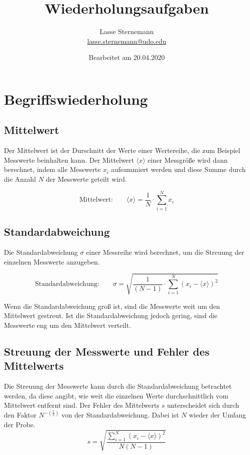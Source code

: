 \documentclass[titlepage = firstcover]{scrartcl}
\title{Wiederholungsaufgaben}
\author{
  Lasse Sternemann\\
  \href{mailto:lasse.sternemann@udo.edu}{lasse.sternemann@udo.edu}
}
\date{Bearbeitet am 20.04.2020}
\begin{document}
    
    \maketitle
    \newpage
    \tableofcontents
    \newpage


    \section{Begriffswiederholung}
        \subsection{Mittelwert}
            Der Mittelwert ist der Durschnitt der Werte einer Wertereihe, die zum Beispiel Messwerte beinhalten kann. Der Mittelwert $\langle x \rangle$ einer 
            Messgröße wird dann berechnet, indem alle Messwerte $x_i$ aufsummiert werden und diese Summe durch die Anzahl $N$ der Messwerte geteilt wird.

            \begin{equation}
                \text{Mittelwert:} \qquad \langle x \rangle = \frac{1}{N} \cdot \sum_{i=1}^N x_i
                \label{eqn:Mittelwert} 
            \end{equation}
            

        \subsection{Standardabweichung}
            Die Standardabweichung $\sigma$ einer Messreihe wird berechnet, um die Streuung der einzelnen Messwerte anzugeben.
            
            \begin{equation}
                \text{Standardabweichung:} \qquad \sigma = \sqrt{\frac{1}{\left(N-1\right)}\cdot \sum_{i=1}^N \left(x_i - \langle x \rangle \right)^2}
            \end{equation}
            
            \noindent Wenn die Standardabweichung groß ist, sind die Messwerte weit um den Mittelwert gestreut. Ist die Standardabweichung jedoch gering, 
            sind die Messwerte eng um den Mittelwert verteilt.

        \subsection{Streuung der Messwerte und Fehler des Mittelwerts}
            Die Streuung der Messwerte kann durch die Standardabweichung betrachtet werden, da diese angibt, wie weit die einzelnen Werte durchschnittlich vom
            Mittelwert entfernt sind. Der Fehler des Mittelwerts $s$ unterscheidet sich durch den Faktor $N^{-(\frac{1}{2})}$ von der Standardabweichung. Dabei ist 
            $N$ wieder der Umfang der Probe. 
            \begin{equation}
                s = \sqrt{\frac{\sum_{i=1}^N \left(x_i - \langle x \rangle \right)^2}{N(N-1)}}
            \end{equation}
\end{document}

